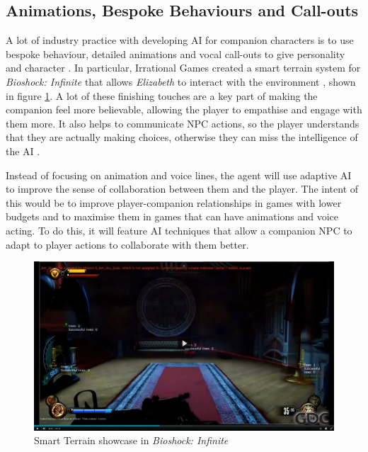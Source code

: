 \documentclass{IEEEtran}
\begin{document}
\subsection{Animations, Bespoke Behaviours and Call-outs}
\label{ABC}

A lot of industry practice with developing AI for companion characters is to use bespoke behaviour, detailed animations and vocal call-outs to give personality and character \cite{GAIP2EllieAI, GMTGoodAI, GAIPOReactions}. In particular, Irrational Games created a smart terrain system for \textit{Bioshock: Infinite} that allows \textit{Elizabeth} to interact with the environment \cite{GDCElizabeth, AIGamesBioshockAI}, shown in figure \ref{fig:BioshockSmartTerrain}. A lot of these finishing touches are a key part of making the companion feel more believable, allowing the player to empathise and engage with them more. It also helps to communicate NPC actions, so the player understands that they are actually making choices, otherwise they can miss the intelligence of the AI \cite{GMTGoodAI}.

Instead of focusing on animation and voice lines, the agent will use adaptive AI to improve the sense of collaboration between them and the player. The intent of this would be to improve player-companion relationships in games with lower budgets and to maximise them in games that can have animations and voice acting. To do this, it will feature AI techniques that allow a companion NPC to adapt to player actions to collaborate with them better.

\begin{figure}
  \centering
  \includegraphics[width=\linewidth]{Images/IndustryResearch/BioshockSmartTerrain.png}
  
\caption{Smart Terrain showcase in \textit{Bioshock: Infinite}}
\label{fig:BioshockSmartTerrain}
\end{figure}
\end{document}
